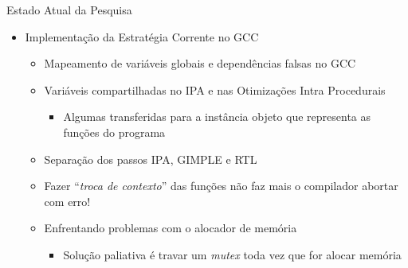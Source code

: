 \begin{frame}{Estado Atual da Pesquisa}
    \begin{itemize}
        \item Implementação da Estratégia Corrente no GCC
            \begin{itemize}
                \item Mapeamento de variáveis globais e dependências falsas no GCC
                \item Variáveis compartilhadas no IPA e nas Otimizações Intra Procedurais
                \begin{itemize}
                    \item Algumas transferidas para a instância objeto que representa as funções do programa
                \end{itemize}
                \item Separação dos passos IPA, GIMPLE e RTL
                \item Fazer ``\textit{troca de contexto}'' das funções não faz mais o compilador abortar com erro!
                \item Enfrentando problemas com o alocador de memória
                \begin{itemize}
                    \item Solução paliativa é travar um \textit{mutex} toda vez que for alocar memória
                \end{itemize}
    \end{itemize}
\end{itemize}
\end{frame}

